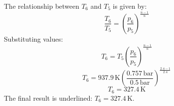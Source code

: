 The relationship between \( T_6 \) and \( T_5 \) is given by:  
\[
\frac{T_6}{T_5} = \left( \frac{p_6}{p_5} \right)^{\frac{n-1}{n}}
\]  
Substituting values:  
\[
T_6 = T_5 \left( \frac{p_6}{p_5} \right)^{\frac{n-1}{n}}
\]  
\[
T_6 = 937.9 \, \text{K} \left( \frac{0.757 \, \text{bar}}{0.5 \, \text{bar}} \right)^{\frac{2.4-1}{2.4}}
\]  
\[
T_6 = 327.4 \, \text{K}
\]  
The final result is underlined: \( T_6 = 327.4 \, \text{K} \).